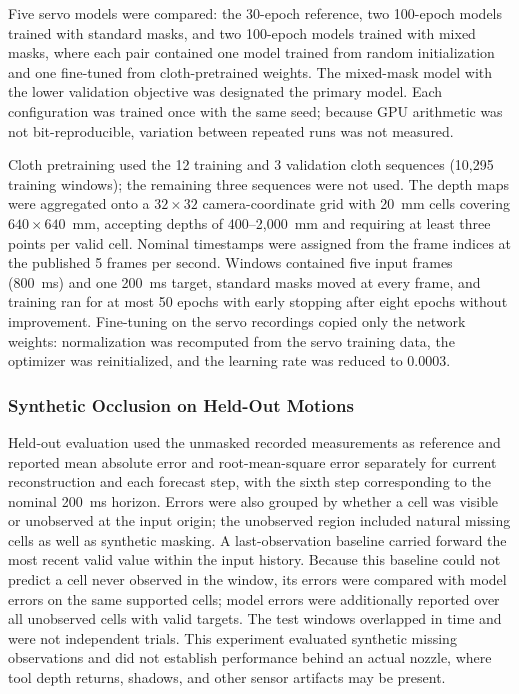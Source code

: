 Five servo models were compared: the 30-epoch reference, two 100-epoch models trained with standard masks, and two 100-epoch models trained with mixed masks, where each pair contained one model trained from random initialization and one fine-tuned from cloth-pretrained weights. The mixed-mask model with the lower validation objective was designated the primary model. Each configuration was trained once with the same seed; because GPU arithmetic was not bit-reproducible, variation between repeated runs was not measured.

Cloth pretraining used the 12 training and 3 validation cloth sequences (10,295 training windows); the remaining three sequences were not used. The depth maps were aggregated onto a $32 \times 32$ camera-coordinate grid with 20~mm cells covering $640 \times 640$~mm, accepting depths of 400--2,000~mm and requiring at least three points per valid cell. Nominal timestamps were assigned from the frame indices at the published 5 frames per second. Windows contained five input frames (800~ms) and one 200~ms target, standard masks moved at every frame, and training ran for at most 50 epochs with early stopping after eight epochs without improvement. Fine-tuning on the servo recordings copied only the network weights: normalization was recomputed from the servo training data, the optimizer was reinitialized, and the learning rate was reduced to 0.0003.


\subsubsection{Synthetic Occlusion on Held-Out Motions}
Held-out evaluation used the unmasked recorded measurements as reference and reported mean absolute error and root-mean-square error separately for current reconstruction and each forecast step, with the sixth step corresponding to the nominal 200~ms horizon. Errors were also grouped by whether a cell was visible or unobserved at the input origin; the unobserved region included natural missing cells as well as synthetic masking. A last-observation baseline carried forward the most recent valid value within the input history. Because this baseline could not predict a cell never observed in the window, its errors were compared with model errors on the same supported cells; model errors were additionally reported over all unobserved cells with valid targets. The test windows overlapped in time and were not independent trials. This experiment evaluated synthetic missing observations and did not establish performance behind an actual nozzle, where tool depth returns, shadows, and other sensor artifacts may be present.

